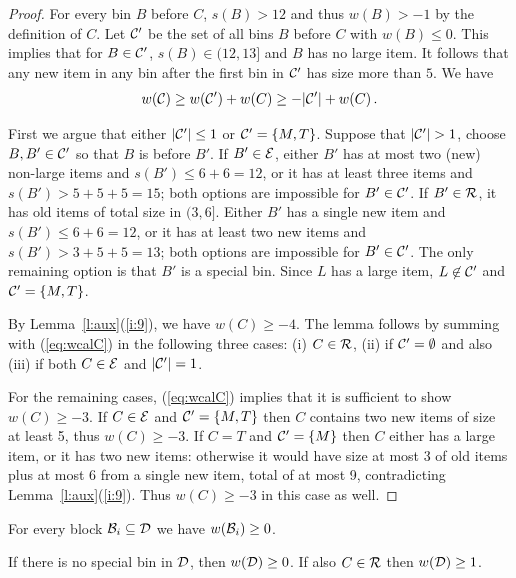 \begin{proof}
For every bin $B$ before $C$, $s(B)>12$ and thus $w(B)>-1$ by the
definition of $C$. Let ${\mathcal C'}$ be the set of all bins $B$ before $C$ with
$w(B)\leq0$. This implies that for $B\in{\mathcal C'}$, $s(B)\in(12,13]$
and $B$ has no large item. It follows that any new item in any
bin after the first bin in ${\mathcal C'}$ has size more than $5$.
We have 
\begin{equation}
\label{eq:wcalC}
w({\mathcal C})\geq w({\mathcal C'})+w(C)\geq-|{\mathcal C'}|+w(C)\,.
\end{equation} 

First we argue that either $|{\mathcal C'}|\leq 1$ or ${\mathcal C'}=\{M,T\}$.
Suppose that $|\Cprime|>1$, choose $B,B'\in{\mathcal C'}$ so that $B$ is before
$B'$.  If $B'\in{\mathcal E}$, either $B'$ has at most two (new) non-large items and
$s(B')\leq 6+6= 12$, or it has at least three items and
$s(B')>5+5+5=15$; both options are impossible for $B'\in{\mathcal C'}$.
If $B'\in{\mathcal R}$, it has old items of total size in
$(3,6]$. Either $B'$ has a single new item and $s(B')\leq 6+6= 12$, or
it has at least two new items and $s(B')>3+5+5=13$; both options
are impossible for $B'\in {\mathcal C'}$. 
The only remaining
option is that $B'$ is a special bin. Since $L$ has a large item,
$L\not\in{\mathcal C'}$ and ${\mathcal C'}=\{M,T\}$.

By Lemma~\ref{l:aux}(\ref{i:9}), we have $w(C)\geq -4$. The lemma
follows by summing with (\ref{eq:wcalC}) in the following three cases: (i)
$C\in{\mathcal R}$, (ii) if ${\mathcal C'}=\emptyset$ and also (iii) if
both $C\in{\mathcal E}$ and $|{\mathcal C'}|=1$.

For the remaining cases, (\ref{eq:wcalC}) implies that it is
sufficient to show $w(C)\geq -3$. 
If $C\in{\mathcal E}$ and ${\mathcal C'}=\{M,T\}$ then $C$ contains two new items of
size at least 5, thus $w(C)\geq -3$.
%
If $C=T$ and ${\mathcal C'}=\{M\}$ then $C$ either has a large item, or it
has two new items: otherwise it would have size at most 3 of old items
plus at most 6 from a single new item, total of at most 9,
contradicting Lemma~\ref{l:aux}(\ref{i:9}). Thus $w(C)\geq -3$ in this
case as well.
\end{proof}

\begin{lem}
\label{l:d} 
\begin{compactenum}[\rm(i)]
\item 
For every block ${\mathcal B}_i\subseteq{\mathcal D}$ we have $w({\mathcal B}_i)\geq 0$.
\item 
If there is no special bin in ${\mathcal D}$, then $w({\mathcal D})\geq 0$.
If also $C\in{\mathcal R}$ then $w({\mathcal D})\geq 1$.
\end{compactenum}
\end{lem}

